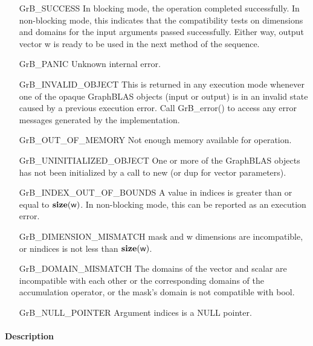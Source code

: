 \begin{itemize}[leftmargin=2.1in]
    \item[{\sf GrB\_SUCCESS}]         In blocking mode, the operation completed
    successfully. In non-blocking mode, this indicates that the compatibility 
    tests on dimensions and domains for the input arguments passed successfully. 
    Either way, output vector {\sf w} is ready to be used in the next method of 
    the sequence.

    \item[{\sf GrB\_PANIC}]            Unknown internal error.
    
    \item[{\sf GrB\_INVALID\_OBJECT}] This is returned in any execution mode 
    whenever one of the opaque GraphBLAS objects (input or output) is in an invalid 
    state caused by a previous execution error.  Call {\sf GrB\_error()} to access 
    any error messages generated by the implementation.

    \item[{\sf GrB\_OUT\_OF\_MEMORY}]  Not enough memory available for operation.
    
    \item[{\sf GrB\_UNINITIALIZED\_OBJECT}] One or more of the GraphBLAS objects
    has not been initialized by a call to {\sf new} (or {\sf dup} for vector
    parameters).

    \item[{\sf GrB\_INDEX\_OUT\_OF\_BOUNDS}]  A value in {\sf indices} is greater
    than or equal to $\bold{size}({\sf w})$.  In non-blocking mode, this can be
    reported as an execution error.
    
    \item[{\sf GrB\_DIMENSION\_MISMATCH}] {\sf mask} and {\sf w} dimensions are
    incompatible, or {\sf nindices} is not less than $\bold{size}({\sf w})$. 

    \item[{\sf GrB\_DOMAIN\_MISMATCH}]    The domains of the vector and scalar are
	incompatible with each other or the corresponding domains of the 
    accumulation operator, or the mask's domain is not compatible with {\sf bool}.

    \item[{\sf GrB\_NULL\_POINTER}] Argument {\sf indices} is a {\sf NULL} pointer.
\end{itemize}


\paragraph{Description}

